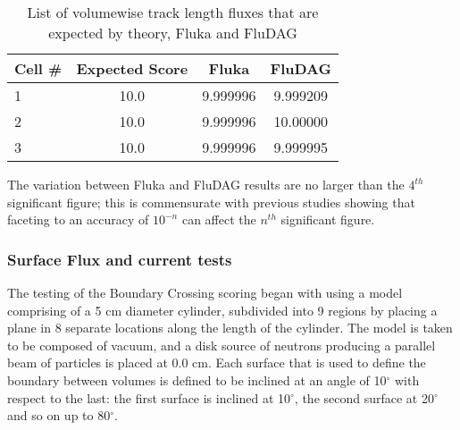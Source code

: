 \documentclass{anstrans}[12pt]
\begin{document}
\begin{table}%
	\begin{center}
		\begin{tabular}{|l|c|c|c|}
			\hline
			Cell \# & Expected Score & Fluka  & FluDAG \\
			\hline
			1 & 10.0 & 9.999996 & 9.999209 \\
			2 & 10.0 & 9.999996 & 10.00000 \\
			3 & 10.0 & 9.999996 & 9.999995 \\
			\hline
		\end{tabular}
		\caption{List of volumewise track length fluxes that are 
			expected by theory, Fluka and FluDAG}\label{usrtrack_comp_sphere}

	\end{center}
\end{table}

The variation between Fluka and FluDAG results are no larger than the
$4^{th}$ significant figure; this is commensurate with previous
studies \cite{snouffer_ans} showing that faceting to an accuracy of $10^{-n}$ can
affect the $n^{th}$ significant figure. 

\subsubsection*{Surface Flux and current tests}
The testing of the Boundary Crossing scoring began with using a model
comprising of a 5 cm diameter cylinder, subdivided into 9 regions by
placing a plane in 8 separate locations along the length of the
cylinder. The model is taken to be composed of vacuum, and a disk
source of neutrons producing a parallel beam of particles is placed at
0.0 cm. Each surface that is used to define the boundary between
volumes is defined to be inclined at an angle of 10$^{\circ}$ with respect to the
last: the first surface is inclined at 10$^{\circ}$, the second
surface at 20$^{\circ}$ and so on up to 80$^{\circ}$.

\end{document}
